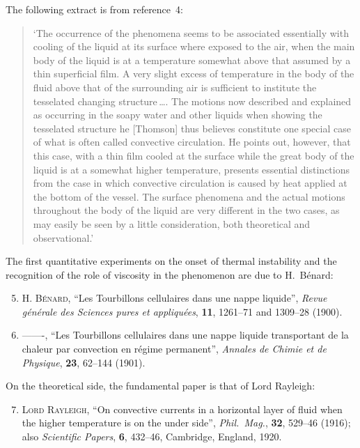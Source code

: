 \noindent The following extract is from reference~4:

\begin{quote}
`The occurrence of the phenomena seems to be associated essentially with
cooling of the liquid at its surface where exposed to the air, when the main
body of the liquid is at a temperature somewhat above that assumed by a thin
superficial film. A very slight excess of temperature in the body of the fluid
above that of the surrounding air is sufficient to institute the tesselated
changing structure\,\ldots. The motions now described and explained as occurring
in the soapy water and other liquids when showing the tesselated structure
he [Thomson] thus believes constitute one special case of what is often called
convective circulation. He points out, however, that this case, with a thin
film cooled at the surface while the great body of the liquid is at a somewhat
higher temperature, presents essential distinctions from the case in which
convective circulation is caused by heat applied at the bottom of the vessel.
The surface phenomena and the actual motions throughout the body of the
liquid are very different in the two cases, as may easily be seen by a little
consideration, both theoretical and observational.'
\end{quote}

\noindent The first quantitative experiments on the onset of thermal instability and the
recognition of the role of viscosity in the phenomenon are due to H.~B\'enard:

\begin{enumerate}
\setcounter{enumi}{4}

\item \textsc{H. B\'enard}, ``Les Tourbillons cellulaires dans une nappe liquide'',
  \textit{Revue g\'en\'erale des Sciences pures et appliqu\'ees}, \textbf{11},
  1261--71 and 1309--28 (1900).

\item -------, ``Les Tourbillons cellulaires dans une nappe liquide transportant de
  la chaleur par convection en r\'egime permanent'', \textit{Annales de Chimie et de
  Physique}, \textbf{23}, 62--144 (1901).

\end{enumerate}

\noindent On the theoretical side, the fundamental paper is that of Lord Rayleigh:

\begin{enumerate}
\setcounter{enumi}{6}

\item \textsc{Lord Rayleigh}, ``On convective currents in a horizontal layer of fluid
  when the higher temperature is on the under side'', \textit{Phil.\ Mag.},
  \textbf{32}, 529--46 (1916); also \textit{Scientific Papers}, \textbf{6}, 432--46,
  Cambridge, England, 1920.

\end{enumerate}


